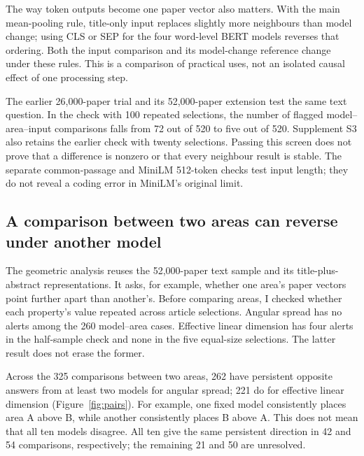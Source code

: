 The way token outputs become one paper vector also matters. With the main mean-pooling rule, title-only input replaces slightly more neighbours than model change; using CLS or SEP for the four word-level BERT models reverses that ordering. Both the input comparison and its model-change reference change under these rules. This is a comparison of practical uses, not an isolated causal effect of one processing step.

The earlier 26,000-paper trial and its 52,000-paper extension test the same text question. In the check with 100 repeated selections, the number of flagged model--area--input comparisons falls from 72 out of 520 to five out of 520. Supplement S3 also retains the earlier check with twenty selections. Passing this screen does not prove that a difference is nonzero or that every neighbour result is stable. The separate common-passage and MiniLM 512-token checks test input length; they do not reveal a coding error in MiniLM's original limit.

\subsection{A comparison between two areas can reverse under another model}
The geometric analysis reuses the 52,000-paper text sample and its title-plus-abstract representations. It asks, for example, whether one area's paper vectors point further apart than another's. Before comparing areas, I checked whether each property's value repeated across article selections. Angular spread has no alerts among the 260 model--area cases. Effective linear dimension has four alerts in the half-sample check and none in the five equal-size selections. The latter result does not erase the former.

Across the 325 comparisons between two areas, 262 have persistent opposite answers from at least two models for angular spread; 221 do for effective linear dimension (Figure~\ref{fig:pairs}). For example, one fixed model consistently places area A above B, while another consistently places B above A. This does not mean that all ten models disagree. All ten give the same persistent direction in 42 and 54 comparisons, respectively; the remaining 21 and 50 are unresolved.

